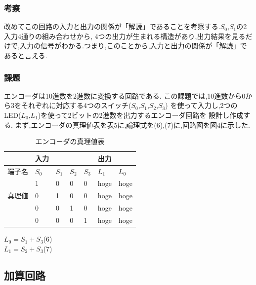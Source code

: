 \documentclass[twocolumn, 10pt,a4j]{jsarticle}
\begin{document}
  \subsubsection{考察}
  改めてこの回路の入力と出力の関係が「解読」であることを考察する.$S_{0}$,$S_{1}$の2入力4通りの組み合わせから,
  4つの出力が生まれる構造があり,出力結果を見るだけで,入力の信号がわかる.つまり,このことから,入力と出力の関係が「解読」であると言える.
  \subsubsection{課題}
  エンコーダは10進数を2進数に変換する回路である.
  この課題では,10進数から0から3をそれぞれに対応する4つのスイッチ($S_{0}$,$S_{1}$,$S_{2}$,$S_{3}$)
  を使って入力し,2つのLED($L_{0}$,$L_{1}$)を使って2ビットの2進数を出力するエンコーダ回路を
  設計し作成する.
  まず,エンコーダの真理値表を表5に,論理式を(6),(7)に,回路図を図4に示した.
  \begin{table}[H]
  \centering
  \caption{エンコーダの真理値表}
  \label{my-label}
  \begin{tabular}{l|llll|ll}
      & 入力      &         &         &         & 出力      &         \\ \hline
  端子名 & $S_{0}$ & $S_{1}$ & $S_{2}$ & $S_{3}$ & $L_{1}$ & $L_{0}$ \\ \hline
      & 1       & 0       & 0       & 0       & hoge    & hoge    \\
  真理値 & 0       & 1       & 0       & 0       & hoge    & hoge    \\
      & 0       & 0       & 1       & 0       & hoge    & hoge    \\
      & 0       & 0       & 0       & 1       & hoge    & hoge   
  \end{tabular}
  \end{table}
  \begin{center}
    $L_{0} = S_{1}+S_{3}$\quad(6) \\
    $L_{1} = S_{2}+S_{3}$\quad(7) \\
  \end{center}
\subsection{加算回路}
\end{document}
